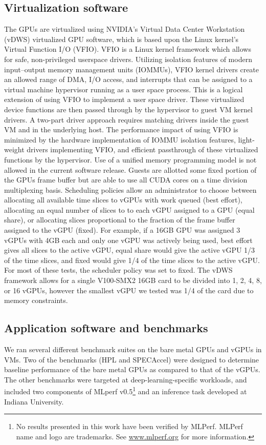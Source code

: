 \documentclass[conference]{IEEEtran}
\begin{document}
\subsection{Virtualization software}\label{sec:virtspec}
The GPUs are virtualized using NVIDIA's Virtual Data Center Workstation \cite{vdws} (vDWS) virtualized GPU software, which is based upon the Linux kernel's Virtual Function I/O \cite{vfio} (VFIO). VFIO is a Linux kernel framework which allows for
safe, non-privileged userspace drivers. Utilizing isolation features of modern input–output memory management units (IOMMUs), VFIO kernel drivers create an allowed range of DMA, I/O access, and interrupts that can be assigned to a virtual machine hypervisor running as a user space process. This is a logical extension of using VFIO to implement a user space driver. These virtualized device functions are then passed through by the hypervisor to guest VM kernel drivers. A two-part driver approach requires matching drivers inside the guest VM and in the underlying host. The performance impact of using VFIO is minimized by the hardware implementation of IOMMU isolation features, light-weight drivers implementing VFIO, and efficient passthrough of these virtualized functions by the hypervisor. Use of a unified memory programming model is not allowed in the current software release. Guests are allotted some fixed portion of the GPUs frame buffer but are able to use all CUDA cores on a time division multiplexing basis. Scheduling policies allow an administrator to choose between allocating all available time slices to vGPUs with work queued (best effort), allocating an equal number of slices to to each vGPU assigned to a GPU (equal share), or allocating slices proportional to the fraction of the frame buffer assigned to the vGPU (fixed). For example, if a 16GB GPU was assigned 3 vGPUs with 4GB each and only one vGPU was actively being used, best effort gives all slices to the active vGPU, equal share would give the active vGPU 1/3 of the time slices, and fixed would give 1/4 of the time slices to the active vGPU. For most of these tests, the scheduler policy was set to fixed. The vDWS framework allows for a single V100-SMX2 16GB card to be divided into 1, 2, 4, 8, or 16 vGPUs, however the smallest vGPU we tested was 1/4 of the card due to memory constraints.  

\subsection{Application software and benchmarks}\label{sec:benchspec}
We ran several different benchmark suites on the bare metal GPUs and vGPUs in VMs. Two of the benchmarks (HPL and SPECAccel) were designed to determine baseline performance of the bare metal GPUs as compared to that of the vGPUs. The other benchmarks were targeted at deep-learning-specific workloads, and included two components of MLperf v0.5\footnote{No results presented in this work have been verified by MLPerf. MLPerf name and logo are trademarks. See \url{www.mlperf.org} for more information.} and an inference task developed at Indiana University.
\end{document}
